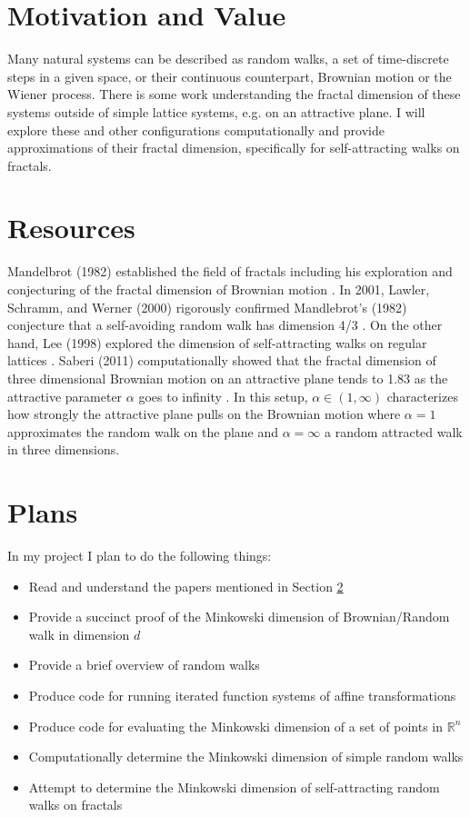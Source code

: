 \documentclass[11pt]{article}
\begin{document}
\section{Motivation and Value} \label{sec:motivation}
Many natural systems can be described as random walks, a set of time-discrete steps in a given space, or their continuous counterpart, Brownian motion or the Wiener process. There is some work understanding the fractal dimension of these systems outside of simple lattice systems, e.g. on an attractive plane. I will explore these and other configurations computationally and provide approximations of their fractal dimension, specifically for self-attracting walks on fractals. 

\section{Resources} \label{sec:resources}
Mandelbrot (1982) established the field of fractals including his exploration and conjecturing of the fractal dimension of Brownian motion \cite{mandelbrot82}. In 2001, Lawler, Schramm, and Werner (2000) rigorously confirmed Mandlebrot's (1982) conjecture that a self-avoiding random walk has dimension 4/3 \cite{lawler+01, mandelbrot82}. On the other hand, Lee (1998) explored the dimension of self-attracting walks on regular lattices \cite{lee98}.  Saberi (2011) computationally showed that the fractal dimension of three dimensional Brownian motion on an attractive plane tends to 1.83 as the attractive parameter $\alpha$ goes to infinity  \cite{saberi11}. In this setup, $\alpha \in (1, \infty)$ characterizes how strongly the attractive plane pulls on the Brownian motion where $\alpha = 1$ approximates the random walk on the plane and $\alpha = \infty$ a random attracted walk in three dimensions. 

\section{Plans} \label{sec:plans}
In my project I plan to do the following things:
\begin{itemize}
\item Read and understand the papers mentioned in Section \ref{sec:resources}
\item Provide a succinct proof of the Minkowski dimension of Brownian/Random walk in dimension $d$
\item Provide a brief overview of random walks
\item Produce code for running iterated function systems of affine transformations
\item Produce code for evaluating the Minkowski dimension of a set of points in $\mathbb{R}^n$
\item Computationally determine the Minkowski dimension of simple random walks
\item Attempt to determine the Minkowski dimension of self-attracting random walks on fractals
\end{itemize}
\end{document}
